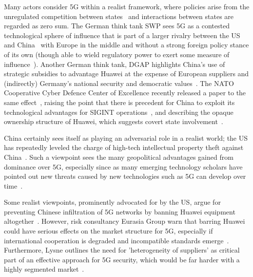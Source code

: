 Many actors consider 5G within a realist framework, where policies arise from
the unregulated competition between states~\cite{donnelly2000realism} and
interactions between states are regarded as zero sum.
The German think tank SWP sees 5G as a contested technological sphere of
influence that is part of a larger rivalry between the US and
China~\cite{rudolf2020sino,lippert2020sinoamerican,lippert2020strategic} with
Europe in the middle and without a strong foreign policy stance of its own
(though able to wield regulatory power to exert some measure of
influence~\cite{bendiek2019europe}).
Another German think tank, DGAP highlights China's use of strategic subsidies to
advantage Huawei at the expense of European suppliers and (indirectly) Germany's
national security and democratic values~\cite{sahin2019berlin}. The NATO
Cooperative Cyber Defence Center of Excellence recently released a paper to the
same effect~\cite{kaska2019huawei}, raising the point that there is precedent
for China to exploit its technological advantages for SIGINT
operations~\cite{demchak2018china}, and describing the opaque ownership
structure of Huawei, which suggests covert state
involvement~\cite{hawes2017transparency,hoffmann2019networks}.

China certainly sees itself as playing an adversarial role in a realist world;
the US has repeatedly leveled the charge of high-tech intellectual property
theft against
China~\cite{drezner2019technological,csis2020panel,csis2019techpolitik,united2018findings}.
Such a viewpoint sees the many geopolitical advantages gained from dominance
over 5G, especially since as many emerging technology scholars have pointed out
new threats caused by new technologies such as 5G can develop over
time~\cite{hauptman2019illuminating,limba2019industry}.

Some realist viewpoints, prominently advocated for by the US, argue for
preventing Chinese infiltration of 5G networks by banning Huawei equipment
altogether~\cite{csis2020panel}. However, risk consultancy Eurasia Group warn
that barring Huawei could have serious effects on the market structure for 5G,
especially if international cooperation is degraded and incompatible standards
emerge~\cite{triolo2018geopolitics}. Furthermore, Lysne outlines the need for
'heterogeneity of suppliers' as critical part of an effective approach for 5G
security, which would be far harder with a highly segmented
market~\cite{lysne2018huawei}.

